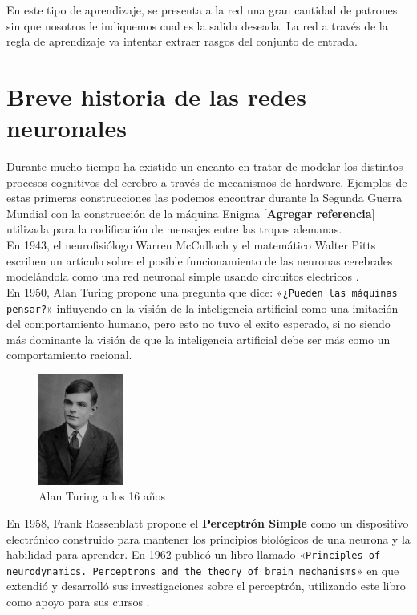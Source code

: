 En este tipo de aprendizaje, se presenta a la red una gran cantidad de
patrones sin que nosotros le indiquemos cual es la salida deseada. La
red a través de la regla de aprendizaje va intentar extraer rasgos del conjunto de entrada.

\section{Breve historia de las redes neuronales}

Durante mucho tiempo ha existido un encanto en tratar de modelar los
distintos procesos cognitivos del cerebro a través de mecanismos de
hardware. Ejemplos de estas primeras construcciones las podemos
encontrar durante la Segunda Guerra Mundial con la construcción de la
máquina Enigma [\textbf{Agregar referencia}] utilizada para la
codificación de mensajes entre las tropas alemanas.\\

En 1943, el neurofisiólogo Warren McCulloch y el matemático Walter
Pitts escriben un artículo sobre el posible funcionamiento de las
neuronas cerebrales modelándola como una red neuronal simple usando
circuitos electricos \cite{mcculloch1943logical}.\\

En 1950, Alan Turing propone una pregunta que dice: «\texttt{¿Pueden
 las máquinas pensar?}» \cite{turing1950computing} influyendo en la
visión de la inteligencia artificial como una imitación del
comportamiento humano, pero esto no tuvo el exito esperado, si no
siendo más dominante la visión de que la inteligencia artificial debe
ser más como un comportamiento racional.\\

\begin{figure}
    \centering
    \includegraphics[width=0.25\textwidth]{Alan_Turing}
    \caption{Alan Turing a los 16 años}
    \label{fig:turing}
\end{figure}

En 1958, Frank Rossenblatt propone el \textbf{Perceptrón Simple}
como un dispositivo electrónico construido para mantener los
principios biológicos de una neurona y la habilidad para aprender. En
1962 publicó un libro llamado «\texttt{Principles of
 neurodynamics. Perceptrons and the theory of brain mechanisms}» en
que extendió y desarrolló sus investigaciones sobre el perceptrón,
utilizando este libro como apoyo para sus cursos \cite{rosenblatt1958perceptron}.\\

